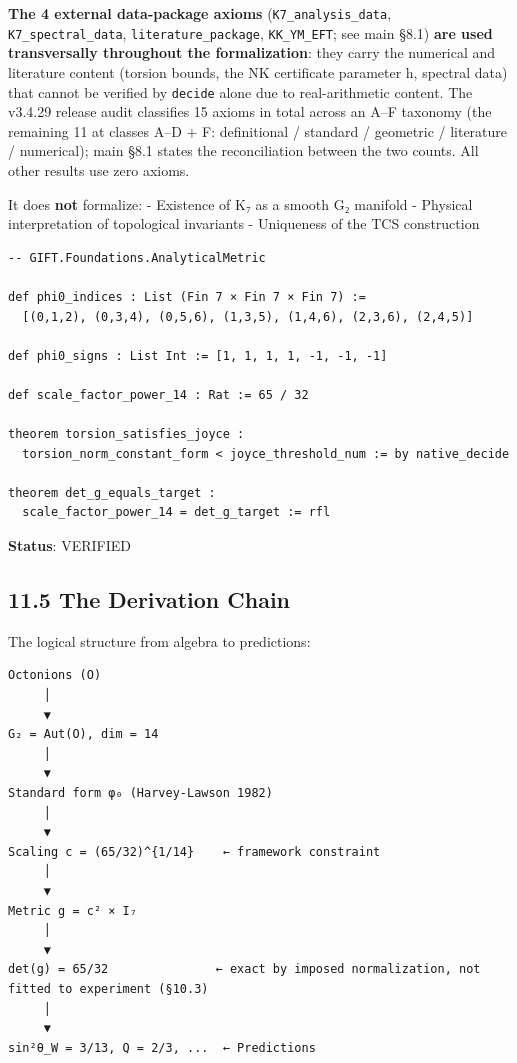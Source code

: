 \documentclass[11pt,a4paper]{article}
\begin{document}
\textbf{The 4 external data-package axioms} (\texttt{K7\_\allowbreak{}analysis\_\allowbreak{}data}, \texttt{K7\_\allowbreak{}spectral\_\allowbreak{}data}, \texttt{literature\_\allowbreak{}package}, \texttt{KK\_\allowbreak{}YM\_\allowbreak{}EFT}; see main §8.1) \textbf{are used transversally throughout the formalization}: they carry the numerical and literature content (torsion bounds, the NK certificate parameter h, spectral data) that cannot be verified by \texttt{decide} alone due to real-arithmetic content. The v3.4.29 release audit classifies 15 axioms in total across an A--F taxonomy (the remaining 11 at classes A--D + F: definitional / standard / geometric / literature / numerical); main §8.1 states the reconciliation between the two counts. All other results use zero axioms.

It does \textbf{not} formalize: - Existence of K₇ as a smooth G₂ manifold - Physical interpretation of topological invariants - Uniqueness of the TCS construction

\begin{verbatim}
-- GIFT.Foundations.AnalyticalMetric

def phi0_indices : List (Fin 7 × Fin 7 × Fin 7) :=
  [(0,1,2), (0,3,4), (0,5,6), (1,3,5), (1,4,6), (2,3,6), (2,4,5)]

def phi0_signs : List Int := [1, 1, 1, 1, -1, -1, -1]

def scale_factor_power_14 : Rat := 65 / 32

theorem torsion_satisfies_joyce :
  torsion_norm_constant_form < joyce_threshold_num := by native_decide

theorem det_g_equals_target :
  scale_factor_power_14 = det_g_target := rfl
\end{verbatim}

\textbf{Status}: VERIFIED

\subsection{11.5 The Derivation Chain}\label{the-derivation-chain}

The logical structure from algebra to predictions:

\begin{verbatim}
Octonions (O)
     │
     ▼
G₂ = Aut(O), dim = 14
     │
     ▼
Standard form φ₀ (Harvey-Lawson 1982)
     │
     ▼
Scaling c = (65/32)^{1/14}    ← framework constraint
     │
     ▼
Metric g = c² × I₇
     │
     ▼
det(g) = 65/32               ← exact by imposed normalization, not fitted to experiment (§10.3)
     │
     ▼
sin²θ_W = 3/13, Q = 2/3, ...  ← Predictions
\end{verbatim}
\end{document}
